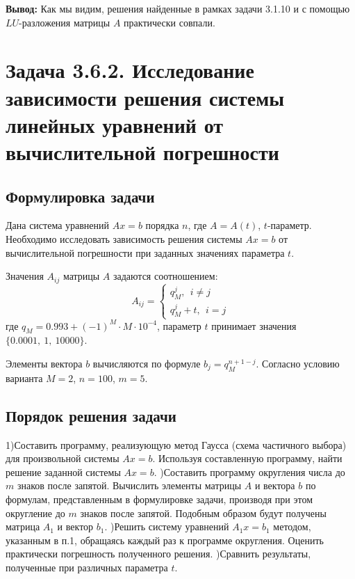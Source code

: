\documentclass[12pt]{article}%
\begin{document}
\textbf{Вывод:} Как мы видим, решения найденные в рамках задачи 3.1.10 и с помощью $LU$-разложения матрицы $A$ практически совпали.
\newpage





\newpage
\section{Задача 3.6.2. Исследование зависимости решения системы линейных уравнений от вычислительной погрешности}
\subsection{Формулировка задачи}
Дана система уравнений $Ax=b$ порядка $n$, где $A = A(t)$, $t$-параметр. Необходимо исследовать зависимость решения системы $Ax=b$ от вычислительной погрешности при заданных значениях параметра $t$.

Значения $A_{ij}$ матрицы $A$ задаются соотношением:
\[
A_{ij} = \begin{cases}
            q_{M}^{j},\ \ i \ne j \\
            q_{M}^{j} + t,\ \ i = j
        \end{cases}
\]
где $q_{M} = 0.993 + (-1)^M \cdot M \cdot 10^{-4}$, параметр $t$ принимает значения $\{0.0001,\ 1,\ 10000\}$. 

Элементы вектора $b$ вычисляются по формуле $b_{j} = q_{M}^{n+1-j}$. Согласно условию варианта $M=2$, $n=100$, $m=5$.


\subsection{Порядок решения задачи}
1)Составить программу, реализующую метод Гаусса (схема частичного выбора) для произвольной системы $Ax=b$. Используя составленную программу, найти решение заданной системы $Ax=b$.
)Составить программу округления числа до $m$ знаков после запятой. Вычислить элементы матрицы $A$ и вектора $b$ по формулам, представленным в формулировке задачи, производя при этом округление до $m$ знаков после запятой. Подобным образом будут получены матрица $A_{1}$ и вектор $b_{1}$.
)Решить систему уравнений $A_{1}x=b_{1}$ методом, указанным в п.1, обращаясь каждый раз к программе округления. Оценить практически погрешность полученного решения.
)Сравнить результаты, полученные при различных параметра $t$.
\end{document}
